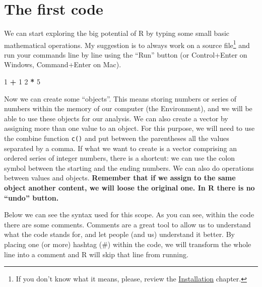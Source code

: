 \documentclass[
]{svmono}
\newenvironment{Shaded}{\begin{snugshade}}{\end{snugshade}}
\newcommand{\DecValTok}[1]{\textcolor[rgb]{0.00,0.00,0.81}{#1}}
\newcommand{\SpecialCharTok}[1]{\textcolor[rgb]{0.81,0.36,0.00}{\textbf{#1}}}
\begin{document}
~

~

~

\hypertarget{the-first-code}{%
\section{The first code}\label{the-first-code}}

We can start exploring the big potential of R by typing some small basic
mathematical operations. My suggestion is to always work on a source
file\footnote{If you don't know what it means, please, review the \protect\hyperlink{installation}{Installation}
  chapter.} and run your commands line by line using the ``Run'' button (or
Control+Enter on Windows, Command+Enter on Mac).

\begin{Shaded}
\begin{Highlighting}[]
\DecValTok{1} \SpecialCharTok{+} \DecValTok{1}
\DecValTok{2} \SpecialCharTok{*} \DecValTok{5}
\end{Highlighting}
\end{Shaded}

Now we can create some ``objects''. This means storing numbers or series
of numbers within the memory of our computer (the Environment), and we
will be able to use these objects for our analysis. We can also create a
vector by assigning more than one value to an object. For this purpose,
we will need to use the combine function \texttt{c()} and put between the
parentheses all the values separated by a comma. If what we want to
create is a vector comprising an ordered series of integer numbers,
there is a shortcut: we can use the colon symbol between the starting
and the ending numbers. We can also do operations between values and
objects. \textbf{Remember that if we assign to the same object another
content, we will loose the original one. In R there is no ``undo''
button.}

Below we can see the syntax used for this scope. As you can see, within
the code there are some comments. Comments are a great tool to allow us
to understand what the code stands for, and let people (and us)
understand it better. By placing one (or more) hashtag (\#) within the
code, we will transform the whole line into a comment and R will skip
that line from running.
\end{document}
